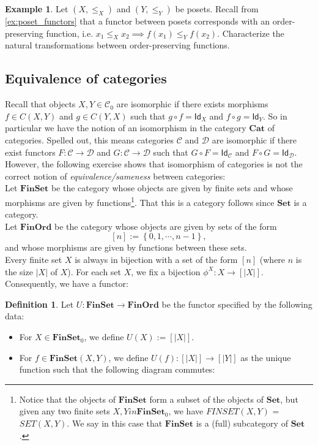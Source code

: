 \documentclass[a4paper,10pt]{scrartcl}
\theoremstyle{plain}
\theoremstyle{definition}
\newtheorem{dfn}[thm]{Definition}
\newtheorem{exa}[thm]{Example}
\newcommand{\cfont}[1]{\ensuremath{\mathsf{#1}}}
\newcommand{\Cat}[1]{\mathcal{#1}}
\newcommand{\CC}{\Cat{C}}
\newcommand{\DD}{\Cat{D}}
\newcommand{\Catb}[1]{\mathbf{#1}}
\newcommand{\SET}{\Catb{Set}}
\newcommand{\FINSET}{\Catb{FinSet}}
\newcommand{\CAT}{\Catb{Cat}}
\newcommand{\Ob}[1]{{#1}_0}
\newcommand{\CHom}[3]{{#1}(#2,#3)}
\newcommand{\Id}[1][]{\cfont{Id}_{#1}}
\newcommand{\co}[2]{\ensuremath{#2 \circ #1}}
\begin{document}
\begin{exa} Let $(X,\leq_X)$ and $(Y,\leq_Y)$ be posets. Recall from \cref{ex:poset_functors} that a functor between posets corresponds with an order-preserving function, i.e. $x_1 \leq_X x_2 \implies f(x_1) \leq_Y f(x_2)$. Characterize the natural transformations between order-preserving functions.
\end{exa}

\subsection{Equivalence of categories}
Recall that objects $X,Y\in\Ob{\CC}$ are isomorphic if there exists morphisms $f\in\CHom{C}{X}{Y}$ and $g\in\CHom{C}{Y}{X}$ such that $\co{f}{g} = \Id[X]$ and $\co{g}{f} = \Id[Y]$. So in particular we have the notion of an isomorphism in the category $\CAT$ of categories. Spelled out, this means categories $\CC$ and $\DD$ are isomorphic if there exist functors $F:\CC\to\DD$ and $G:\CC\to\DD$ such that $\co{F}{G}= \Id[\CC]$ and $\co{G}{F} = \Id[\DD]$.\\
However, the following exercise shows that isomorphism of categories is not the correct notion of \textit{equivalence/sameness} between categories:\\
Let $\FINSET$ be the category whose objects are given by finite sets and whose morphisms are given by functions\footnote{Notice that the objects of $\FINSET$ form a subset of the objects of $\SET$, but given any two finite sets $X,Y in \Ob{\FINSET}$, we have $\CHom{FINSET}{X}{Y}$ = $\CHom{SET}{X}{Y}$. We say in this case that $\FINSET$ is a (full) subcategory of $\SET$.}. That this is a category follows since $\SET$ is a category.\\
Let $\Catb{FinOrd}$ be the category whose objects are given by sets of the form 
\[
[n] := \left\{0,1,\cdots,n-1\right\},
\]
and whose morphisms are given by functions between these sets.\\
Every finite set $X$ is always in bijection with a set of the form $[n]$ (where $n$ is the size $\vert X\vert$ of $X$). For each set $X$, we fix a bijection $\phi^X: X\to [\vert X\vert]$. Consequently, we have a functor:
\begin{dfn} Let $U: \FINSET\to \Catb{FinOrd}$ be the functor specified by the following data:
\begin{itemize}
\item For $X\in \Ob{\FINSET}$, we define $U(X) := [\vert X\vert]$.
\item For $f\in \CHom{\FINSET}{X}{Y}$, we define $U(f): [\vert X\vert]\to [\vert Y\vert]$ as the unique function such that the following diagram commutes:
\begin{center}
\end{center}
\end{itemize}
\end{dfn}
\end{document}

